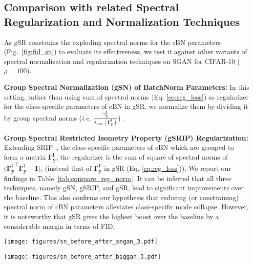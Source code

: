 \documentclass[runningheads,table]{llncs}
\newcommand{\ie}{\textit{i}.\textit{e}. }
\begin{document}
\subsection{Comparison with related Spectral Regularization and Normalization Techniques}
\label{sec:srsn}
As gSR constrains the exploding spectral norms for the cBN parameters (Fig.~\ref{fig:fid_sn})
to evaluate its effectiveness, we test it against other variants of spectral normalization and regularization techniques on SGAN for CIFAR-10 ($\rho=100$).

\noindent\textbf{Group Spectral Normalization (gSN) of BatchNorm Parameters:} In this setting, rather than using sum of spectral norms (Eq. \ref{eq:reg_loss}) as regularizer for the class-specific parameters of cBN in gSR, we normalize them by dividing it by group spectral norms (\ie $\frac{\mathbf{\gamma^l_y}}{\sigma_{max}(\mathbf{\Gamma^l_y})}$) \cite{miyato2018spectral}.



\noindent\textbf{Group Spectral Restricted Isometry Property (gSRIP) Regularization:}  Extending SRIP~\cite{bansal2018can}, the class-specific parameters of cBN which are grouped to form a matrix $\mathbf{\Gamma^l_y}$, the regularizer is the sum of square of spectral norms of $(\mathbf{\Gamma^l_y}^\intercal\mathbf{\Gamma^l_y} - \mathbf{I)}$, (instead that of $\mathbf{\Gamma^l_y}$ in gSR (Eq. \ref{eq:reg_loss})). We report our findings in Table~\ref{tab:compare_reg_norm}. It can be inferred that all three techniques, namely gSN, gSRIP, and gSR, lead to significant improvements over the baseline. This also confirms our hypothesis that reducing (or constraining) spectral norm of cBN parameters alleviates class-specific mode collapse. However, it is noteworthy that gSR gives the highest boost over the baseline by a considerable margin in terms of FID.


\begin{figure*}[t]
  \centering
  \begin{minipage}[t]{0.45\linewidth}
    \centering
    \texttt{[image: figures/sn\_before\_after\_sngan\_3.pdf]}
  \end{minipage}
  \begin{minipage}[t]{0.54\linewidth}
    \centering
    \texttt{[image: figures/sn\_before\_after\_biggan\_3.pdf]}
  \end{minipage}
    \caption{\textbf{Effect of gSR on spectral norms of $\mathbf{\Gamma^l_y}$ (CIFAR-10).} We observe a spectral explosion both for SNGAN(\textit{left}) and BigGAN(\textit{right}) baselines of tail classes' cBN parameters. This is prevented by addition of gSR as shown on corresponding right.}
  \label{fig:fid_sn}
\end{figure*}
\end{document}
